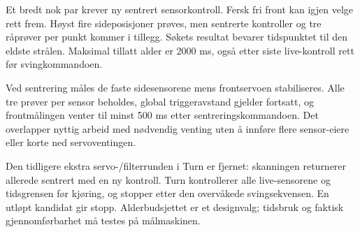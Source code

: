 Et bredt nok par krever ny sentrert sensorkontroll. Fersk fri front kan
igjen velge rett frem. Høyst fire sideposisjoner prøves, men sentrerte
kontroller og tre råprøver per punkt kommer i tillegg. Søkets resultat
bevarer tidspunktet til den eldste strålen. Maksimal tillatt alder er
2000 ms, også etter siste live-kontroll rett før svingkommandoen.

Ved sentrering måles de faste sidesensorene mens frontservoen stabiliseres.
Alle tre prøver per sensor beholdes, global triggeravstand gjelder fortsatt,
og frontmålingen venter til minst 500 ms etter sentreringskommandoen.
Det overlapper nyttig arbeid med nødvendig venting uten å innføre flere
sensor-eiere eller korte ned servoventingen.

Den tidligere ekstra servo-/filterrunden i Turn er fjernet: skanningen
returnerer allerede sentrert med en ny kontroll. Turn kontrollerer alle
live-sensorene og tidsgrensen før kjøring, og stopper etter den overvåkede
svingsekvensen. En utløpt kandidat gir stopp. Alderbudsjettet er et
designvalg; tidsbruk og faktisk gjennomførbarhet må testes på målmaskinen.
